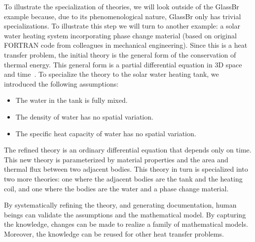 \documentclass[sigconf,review,anonymous=false]{acmart}
\begin{document}
To illustrate the specialization of theories, we will look outside of the
GlassBr example because, due to its phenomenological nature, GlassBr only has
trivial specializations.  To illustrate this step we will turn to another
example: a solar water heating system incorporating phase change material
\cite{DouviEtAl2021} (based on original FORTRAN code from colleagues in
mechanical engineering).  Since this is a heat transfer problem, the initial
theory is the general form of the conservation of thermal energy. This general
form is a partial differential equation in 3D space and
time~\cite{BirdEtAl2002}.  To specialize the theory to the solar water heating
tank, we introduced the following assumptions:

\begin{itemize}

\item The water in the tank is fully mixed.

\item The density of water has no spatial variation.

\item The specific heat capacity of water has no spatial variation.

\end{itemize}

The refined theory is an ordinary differential equation that depends only on
time.  This new theory is parameterized by material properties and the area and
thermal flux between two adjacent bodies. This theory in turn is specialized
into two more theories: one where the adjacent bodies are the tank and the
heating coil, and one where the bodies are the water and a phase change
material.

By systematically refining the theory, and generating documentation, human
beings can validate the assumptions and the mathematical model. By capturing the
knowledge, changes can be made to realize a family of mathematical models.
Moreover, the knowledge can be reused for other heat transfer problems.

%
%
%
%
\end{document}
